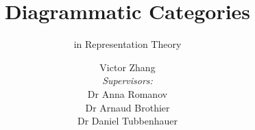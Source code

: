 \documentclass{beamer}
\title{Diagrammatic Categories}
\subtitle{in Representation Theory}
\author{Victor Zhang\\[.5em]
\small{
    \textit{Supervisors:}\\
    Dr Anna Romanov\\
    Dr Arnaud Brothier\\
    Dr Daniel Tubbenhauer
}
}
\institute{UNSW Sydney}
\date{}
\begin{document}
\maketitle
\subtitle{}
\author{}
\institute{}




\end{document}
